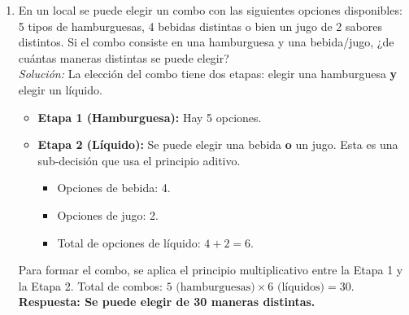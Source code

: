 \documentclass[12pt, letterpaper]{article}
\begin{document}
\begin{enumerate}
    \item En un local se puede elegir un combo con las siguientes opciones disponibles: 5 tipos de hamburguesas, 4 bebidas distintas o bien un jugo de 2 sabores distintos. Si el combo consiste en una hamburguesa y una bebida/jugo, ¿de cuántas maneras distintas se puede elegir? \\
    \textit{Solución:}
    La elección del combo tiene dos etapas: elegir una hamburguesa \textbf{y} elegir un líquido.
    \begin{itemize}
        \item \textbf{Etapa 1 (Hamburguesa):} Hay 5 opciones.
        \item \textbf{Etapa 2 (Líquido):} Se puede elegir una bebida \textbf{o} un jugo. Esta es una sub-decisión que usa el principio aditivo.
        \begin{itemize}
            \item Opciones de bebida: 4.
            \item Opciones de jugo: 2.
            \item Total de opciones de líquido: $4 + 2 = 6$.
        \end{itemize}
    \end{itemize}
    Para formar el combo, se aplica el principio multiplicativo entre la Etapa 1 y la Etapa 2.
    Total de combos: $5 \text{ (hamburguesas)} \times 6 \text{ (líquidos)} = 30$. \\
    \textbf{Respuesta: Se puede elegir de 30 maneras distintas.}
\end{enumerate}

\end{document}
